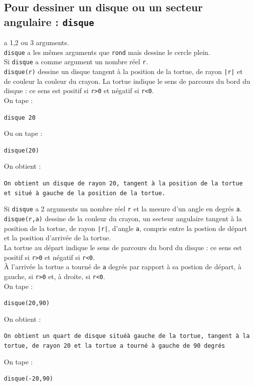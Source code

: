 \documentclass[a4paper,11pt]{book}
\begin{document}
\subsection{Pour dessiner un disque ou un secteur angulaire : {\tt disque}}
 a 1,2 ou 3 arguments.\\ 
{\tt disque} a les m\^emes arguments que {\tt rond} mais dessine le cercle 
plein.\\
Si {\tt disque} a comme argument un nombre r\'eel {\tt r}.\\
{\tt disque(r)} dessine un disque tangent \`a la position de la tortue, de 
rayon {\tt |r|} et de couleur la couleur du crayon. La tortue indique le 
sens de parcours du bord du disque : ce sens est positif si {\tt r>0} et  
n\'egatif si {\tt r<0}.\\
On tape :
\begin{center}{\tt disque 20}\end{center}
Ou on tape :
\begin{center}{\tt disque(20)}\end{center}
On obtient :
\begin{center}{\tt On obtient un disque  de rayon 20, tangent \`a la position de la tortue et situ\'e \`a gauche de la position de la tortue.}\end{center}
Si {\tt disque} a 2 arguments un nombre r\'eel {\tt r} et la 
mesure d'un angle en degr\'es {\tt a}.\\
{\tt disque(r,a)} dessine de la couleur du crayon, un secteur angulaire
tangent \`a la position de la tortue, de rayon {\tt |r|}, d'angle {\tt a}, 
compris entre la postion de d\'epart et la position d'arriv\'ee de la tortue.\\
La tortue au d\'epart indique le 
sens de parcours du bord du disque : ce sens est positif si {\tt r>0} et  
n\'egatif si {\tt r<0}.\\
\`A l'arriv\'ee la tortue a tourn\'e de {\tt a} degr\'es par rapport \`a sa 
postion de d\'epart, \`a gauche, si {\tt r>0} et, \`a droite, si {\tt r<0}.\\
On tape :
\begin{center}{\tt disque(20,90)}\end{center}
On obtient :
\begin{center}{\tt On obtient un quart de disque situ\'e\`a gauche de la tortue, tangent \`a la tortue, de rayon 20 et la tortue a tourn\'e \`a gauche de 90 degr\'es}\end{center}
On tape :
\begin{center}{\tt disque(-20,90)}\end{center}
\end{document}
